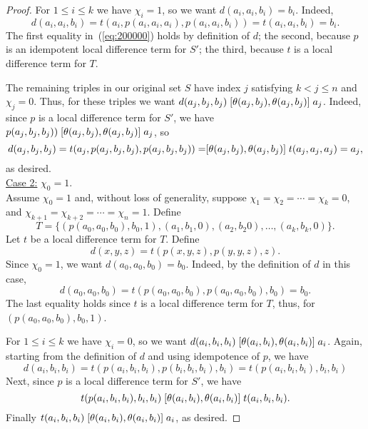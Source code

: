 \begin{proof}
For $1\leq i \leq k$ we have $\chi_i =1$, so we want  $d(a_i,a_i,b_i) = b_i$. Indeed,
\begin{equation}
  \label{eq:200000}
  d(a_i,a_i,b_i) =
  t(a_i, p(a_i,a_i,a_i), p(a_i,a_i,b_i))=
  t(a_i, a_i, b_i) =b_i.
\end{equation}
The first equality in~(\ref{eq:200000}) holds by definition of $d$;
the second, because $p$ is an idempotent local difference term for
$S'$; the third, because $t$ is a local difference term for $T$.

The remaining triples in our original set $S$
have index $j$ satisfying $k<j\leq n$ and $\chi_j = 0$.
Thus, for these triples we want
$d(a_j,b_j,b_j)\mathrel{[\operatorname{\theta}(a_j,b_j), \operatorname{\theta}(a_j,b_j)]} a_j$. Indeed,
since $p$ is a local difference term for $S'$, we have
$p(a_j,b_j,b_j))  \mathrel{[\operatorname{\theta}(a_j,b_j), \operatorname{\theta}(a_j,b_j)]} a_j$, so
\begin{equation*}
  d(a_j,b_j,b_j) =
  t(a_j, p(a_j,b_j,b_j), p(a_j,b_j,b_j)) =
  \mathrel{[\operatorname{\theta}(a_j,b_j), \operatorname{\theta}(a_j,b_j)]} t(a_j,a_j,a_j) = a_j,
\end{equation*}
as desired.
\\[6pt]
\underline{Case 2:}
$\chi_0 = 1$.
\\[4pt]
Assume $\chi_0 = 1$ and, 
without loss of generality, suppose $\chi_1 = \chi_2 =\cdots =\chi_k = 0$,
and $\chi_{k+1} = \chi_{k+2} = \cdots = \chi_{n} = 1$. Define
\[
T = \{(p(a_0, a_0, b_0), b_0, 1),
(a_1, b_1, 0), (a_2, b_2 0), \dots, (a_k, b_k, 0)\}.
\]
Let $t$ be a local difference term for $T$.
Define
\[d(x,y,z) = t(p(x,y,z), p(y,y,z), z).\] 
Since $\chi_0 =1$, we want $d(a_0,a_0,b_0) = b_0$. Indeed, by the definition of
$d$ in this case,
\begin{equation*}
  d(a_0,a_0,b_0) =
  t(p(a_0,a_0,b_0), p(a_0,a_0,b_0), b_0) =b_0.
\end{equation*}
The last equality holds since $t$ is a local difference term for $T$, thus,
for $(p(a_0, a_0, b_0), b_0, 1)$.

For $1\leq i \leq k$ we have $\chi_i =0$, so we want
$d(a_i,b_i,b_i) \mathrel{[\operatorname{\theta}(a_i,b_i), \operatorname{\theta}(a_i,b_i)]} a_i$.
Again, starting from the definition of $d$ and using idempotence of $p$, we have
\begin{equation*}
  d(a_i,b_i,b_i) =
  t(p(a_i,b_i,b_i), p(b_i,b_i,b_i), b_i)=
  t(p(a_i,b_i,b_i), b_i, b_i)
\end{equation*}
Next, since $p$ is a local difference term for $S'$, we have
\[
  t(p(a_i,b_i,b_i), b_i, b_i)
 \mathrel{[\operatorname{\theta}(a_i,b_i), \operatorname{\theta}(a_i,b_i)]}
 t(a_i, b_i, b_i).
 \]
Finally  $ t(a_i, b_i, b_i) \mathrel{[\operatorname{\theta}(a_i,b_i), \operatorname{\theta}(a_i,b_i)]} a_i$, as desired.


\end{proof}
